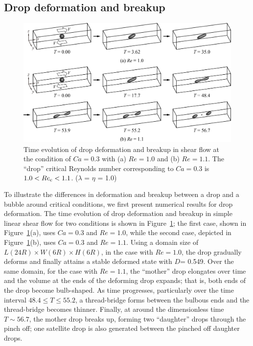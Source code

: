 \documentclass[%
 reprint,
 showkeys,
 amsmath,amssymb,
 aps,
 prfluids,
 onecolumn
]{revtex4-2}
\newcommand{\lwh}[3]{L(#1R)\times W(#2R) \times H(#3R)}
\begin{document}
\subsection{Drop deformation and breakup}\label{sec:DropBreak}
% 
\begin{figure}%
  \centering
  \includegraphics[width=\textwidth]{DropBreakEvol}
  \caption{Time evolution of drop deformation and breakup in shear flow at the
           condition of $Ca=0.3$ with (a) $Re=1.0$ and (b) $Re=1.1$.  The
	   ``drop'' critical Reynolds number corresponding to $Ca=0.3$ is
	   $1.0<Re_{\rm c}<1.1$.
	   ($\lambda$ = $\eta$ = 1.0)}
  \label{fig:DropBreak}
\end{figure}
%
To illustrate the differences in deformation and breakup between a drop and a
bubble around critical conditions, we first present numerical results for drop
deformation.  The time evolution of drop deformation and breakup in simple
linear shear flow for two conditions is shown in Figure~\ref{fig:DropBreak};
the first case, shown in Figure~\ref{fig:DropBreak}(a), uses $Ca=0.3$ and
$Re=1.0$, while the second case, depicted in Figure~\ref{fig:DropBreak}({\color{red}b}),
uses $Ca=0.3$ and $Re=1.1$.  Using a domain size of $\lwh{24}{6}{6}$, in the
case with $Re=1.0$, the drop gradually deforms and finally attains a stable
deformed state with {\color{red} $D$}= 0.549.  Over the same domain, for the case with
$Re=1.1$, the ``mother'' drop elongates over time and the volume at the ends of
the deforming drop expands; that is, both ends of the drop become bulb-shaped.
As time progresses, particularly over the time interval $48.4 \leq T \leq
55.2$, a thread-bridge forms between the bulbous ends and the thread-bridge
becomes thinner.  Finally, at around the dimensionless time $T\sim 56.7$, the
mother drop breaks up, forming two ``daughter'' drops through the pinch off;
one satellite drop is also generated between the pinched off daughter drops.
\end{document}
